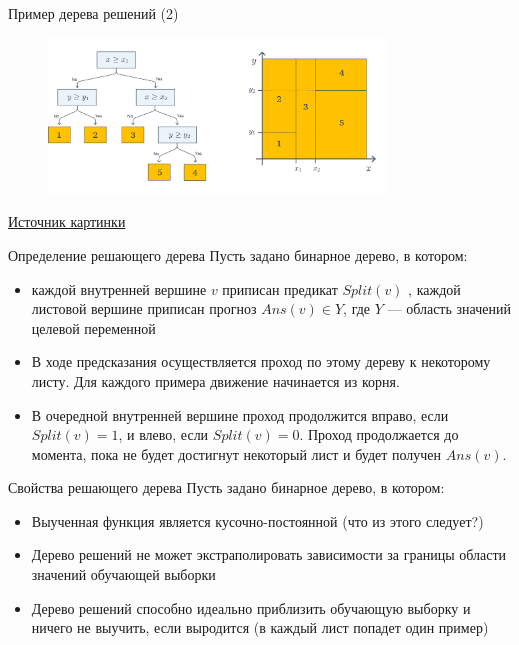 \documentclass{beamer}
\begin{document}
\begin{frame}{Пример дерева решений (2)}
    \small
    \begin{figure}[H]
        \includegraphics[width=0.8\textwidth]{images/tree_2.png}
    \end{figure}
    \href{https://academy.yandex.ru/handbook/ml/article/reshayushchiye-derevya}{Источник картинки }
\end{frame}


\begin{frame}{Определение решающего дерева}
    \small
    Пусть задано бинарное дерево, в котором:
    \begin{itemize}
         \item каждой внутренней вершине $v$ приписан предикат $Split(v)$ , каждой листовой вершине  приписан прогноз $Ans(v) \in{Y} $, где $Y$ — область значений целевой переменной
        \item В ходе предсказания осуществляется проход по этому дереву к некоторому листу. Для каждого примера движение начинается из корня. 
        \item В очередной внутренней вершине проход продолжится вправо, если $Split(v)=1$, и влево, если $Split(v)=0$. Проход продолжается до момента, пока не будет достигнут некоторый лист и будет получен $Ans(v)$.
    \end{itemize}
    
\end{frame}

\begin{frame}{Свойства решающего дерева}
    \small
    Пусть задано бинарное дерево, в котором:
    \begin{itemize}
         \item Выученная функция является кусочно-постоянной (что из этого следует?)
        \item Дерево решений не может экстраполировать зависимости за границы области значений обучающей выборки
        \item Дерево решений способно идеально приблизить обучающую выборку и ничего не выучить, если выродится (в каждый лист попадет один пример)
    \end{itemize}
    
\end{frame}
\end{document}
